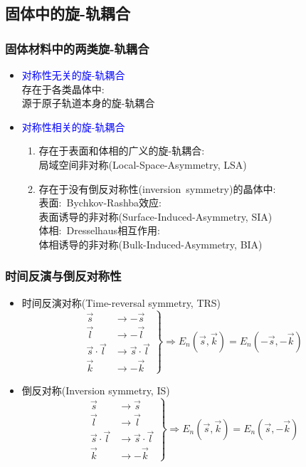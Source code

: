 \subsection{固体中的旋-轨耦合}
\frame
{
	\frametitle{固体材料中的两类旋-轨耦合}
	\begin{itemize}
		\item \textcolor{blue}{对称性无关的旋-轨耦合}\\
			存在于各类晶体中:\\
			源于原子轨道本身的旋-轨耦合
		\item \textcolor{blue}{对称性相关的旋-轨耦合}\\
			\begin{enumerate}
		\setlength{\itemsep}{5pt}
				\item 存在于表面和体相的广义的旋-轨耦合:\\
					局域空间非对称\textrm{(Local-Space-Asymmetry, LSA)}\\
				\item 存在于没有倒反对称性\textrm{(inversion~symmetry)}的晶体中:\\
			表面:~\textrm{Bychkov-Rashba}效应:\\
			表面诱导的非对称\textrm{(Surface-Induced-Asymmetry, SIA)}\\
			\vskip 4pt
			体相:~\textrm{Dresselhaus}相互作用:\\
			体相诱导的非对称\textrm{(Bulk-Induced-Asymmetry, BIA)}\\
			\end{enumerate}
	\end{itemize}
}

\frame
{
	\frametitle{时间反演与倒反对称性}
	\begin{itemize}
		\item 时间反演对称\textrm{(Time-reversal symmetry, TRS)}\\
			\begin{displaymath}
			\left.
				\begin{aligned}
					\vec s&\rightarrow -\vec s\\
					\vec l&\rightarrow -\vec l\\
					\vec s\cdot\vec l&\rightarrow \vec s\cdot\vec l\\
					\vec k&\rightarrow-\vec k
				\end{aligned}\right\}\Longrightarrow E_n(\vec s,\vec k)=E_n(-\vec s,-\vec k)
			\end{displaymath}
		\item 倒反对称\textrm{(Inversion symmetry, IS)}
			\begin{displaymath}
			\left.
				\begin{aligned}
					\vec s&\rightarrow \vec s\\
					\vec l&\rightarrow \vec l\\
					\vec s\cdot\vec l&\rightarrow \vec s\cdot\vec l\\
					\vec k&\rightarrow-\vec k
				\end{aligned}\right\}\Longrightarrow E_n(\vec s,\vec k)=E_n(\vec s,-\vec k)
			\end{displaymath}
	\end{itemize}
}

